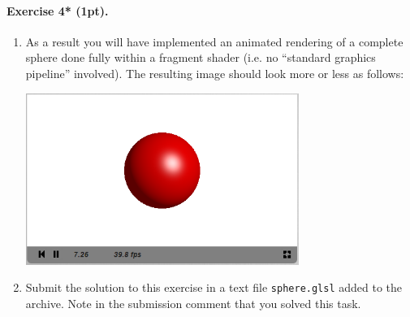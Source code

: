 \documentclass{article}
\newenvironment{exercise}[2]{\paragraph{Exercise #1 (#2pt).} }{
\medskip}
\begin{document}
\begin{exercise}{4*}{1}
\begin{enumerate}
\begin{enumerate}
Hint: Every point on the sphere satisfies $$x^2 + y^2 + z^2 = R^2.$$
\item Compute the normal at this point.
\item Assume the direction to the viewer is $(0, 0, 1)$ as usual.
\item Assume that the sphere is illuminated by a positional light source located at $(5, 2, 5)$. Compute the light direction and the reflection vectors.
\item Assume the sphere's diffuse color is red $(1, 0, 0)$, specular is white $(1, 1, 1)$, shininess is $15$, ambient light is $(0.1, 0.1, 0.1)$. Let the light source intensity be $(0.7, 0.7, 0.7)$ for both diffuse and specular components. Assume no attenuation. Given this information and the previously computed vectors, evaluate the Phong lighting model at the corresponding point on the sphere.
\item Apply gamma correction.
\item Apply HDR, if you find it necessary.
\item Finally, make the light position move around the sphere in a circle. I.e. do something like
\begin{lstlisting}
vec3 light_pos = vec3(5.0*cos(iGlobalTime), 2.0, 
				5.0*sin(iGlobalTime));
\end{lstlisting}
\end{enumerate}
\item As a result you will have implemented an animated rendering of a complete sphere done fully within a fragment shader (i.e. no ``standard graphics pipeline'' involved). The resulting image should look more or less as follows:
\begin{center}
\includegraphics[width=0.7\textwidth]{sphere.png}
\end{center}
\item Submit the solution to this exercise in a text file \texttt{sphere.glsl} added to the archive. Note in the submission comment that you solved this task.
\end{enumerate}
\end{exercise}
\end{document}
